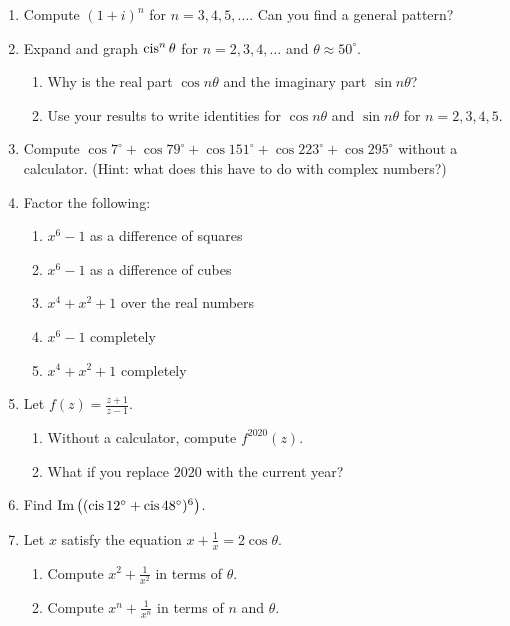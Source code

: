 \documentclass[../gatm.tex]{subfiles}
\begin{document}
\begin{enumerate}
\item Compute $(1+i)^n$ for $n=3,4,5,\ldots$. Can you find a general pattern? %
\item Expand and graph $\operatorname{cis}^n \theta$ for $n=2,3,4,\ldots$ and $\theta\approx 50^\circ$. %

\begin{enumerate}
\item Why is the real part $\cos n\theta$ and the imaginary part $\sin n\theta$? %
\item Use your results to write identities for $\cos n\theta$ and $\sin n\theta$ for $n=2,3,4,5$. %
\end{enumerate}

\newcommand{\cosdeg}[1] {\cos #1^\circ}

\item Compute $\cosdeg{7} + \cosdeg{79} + \cosdeg{151} + \cosdeg{223} + \cosdeg{295}$ without a calculator. (Hint: what does this have to do with complex numbers?) %
\item Factor the following: %
\begin{multicols}{2}\raggedcolumns
\begin{enumerate}
\item $x^6-1$ as a difference of squares %
\item $x^6-1$ as a difference of cubes %
\item $x^4+x^2+1$ over the real numbers %
\item $x^6-1$ completely %
\item $x^4+x^2+1$ completely %
\end{enumerate}
\end{multicols}

\item Let $f(z)=\frac{z+1}{z-1}$. %
\begin{enumerate}
\item Without a calculator, compute $f^{2020}(z)$. %
\item What if you replace $2020$ with the current year? %
\end{enumerate}

\item Find $\operatorname{Im}\left((\operatorname{cis} 12^\circ + \operatorname{cis} 48^\circ)^6\right)$. %

\item Let $x$ satisfy the equation $x+\frac{1}{x}=2\cos\theta$. %
\begin{enumerate}
\item Compute $x^2+\frac{1}{x^2}$ in terms of $\theta$. %
\item Compute $x^n+\frac{1}{x^n}$ in terms of $n$ and $\theta$. %
\end{enumerate}
\end{enumerate}
\end{document}
